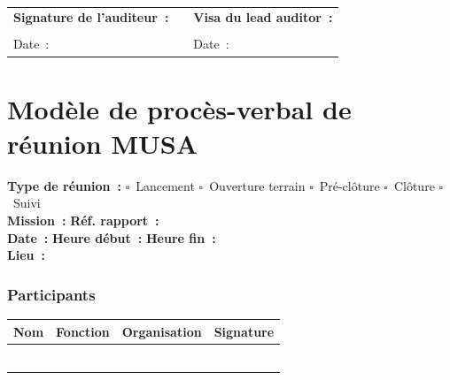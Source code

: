 \documentclass[12pt,a4paper,oneside]{report}
\begin{document}
\vspace{0.2cm}
\dotfill \\[0.3cm]
\dotfill

\vspace{0.5cm}

\begin{tabular}{p{5cm}p{3cm}p{5cm}}
\textbf{Signature de l'auditeur~:} & & \textbf{Visa du lead auditor~:} \\[1.5cm]
\dotfill & & \dotfill \\[0.3cm]
Date~: \dotfill & & Date~: \dotfill \\
\end{tabular}

\newpage

\chapter{Mod\`ele de proc\`es-verbal de r\'eunion MUSA}
\label{annexe:pv}

\begin{goldbox}[title={\color{navy}\bfseries PROC\`ES-VERBAL DE R\'EUNION}]
\small
\textbf{Type de r\'eunion~:}
$\square$~Lancement \quad
$\square$~Ouverture terrain \quad
$\square$~Pr\'e-cl\^oture \quad
$\square$~Cl\^oture \quad
$\square$~Suivi \\[4pt]
\textbf{Mission~:} \dotfill \quad \textbf{R\'ef. rapport~:} \dotfill \\[4pt]
\textbf{Date~:} \dotfill \quad \textbf{Heure d\'ebut~:} \dotfill \quad \textbf{Heure fin~:} \dotfill \\[4pt]
\textbf{Lieu~:} \dotfill
\end{goldbox}

\subsection*{Participants}

\begin{table}[H]
\centering\small
\begin{tabularx}{\textwidth}{p{4cm}p{3cm}p{3cm}X}
\toprule
\rowcolor{theadcolor}
\color{white}\textbf{Nom} &
\color{white}\textbf{Fonction} &
\color{white}\textbf{Organisation} &
\color{white}\textbf{Signature} \\
\midrule
& & & \\[0.4cm]
& & & \\[0.4cm]
& & & \\[0.4cm]
& & & \\[0.4cm]
& & & \\[0.4cm]
& & & \\
\bottomrule
\end{tabularx}
\end{table}
\end{document}
